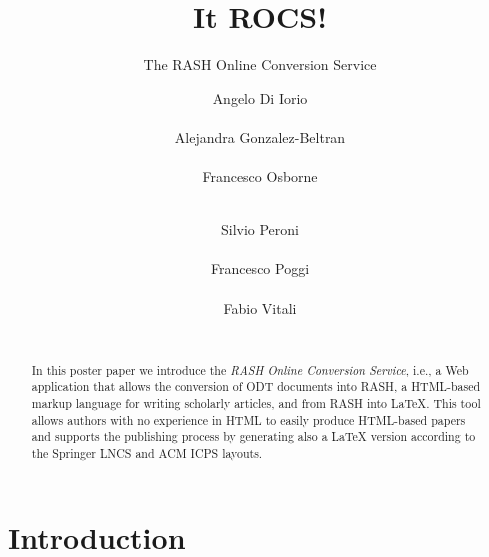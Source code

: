\documentclass{sig-alternate}
\begin{document}
\title{It ROCS!}
\subtitle{The RASH Online Conversion Service}

\author{
\alignauthor
Angelo Di Iorio\\
\\
\alignauthor
Alejandra Gonzalez-Beltran\\
\\
\alignauthor
Francesco Osborne\\
\\
\and
\alignauthor
Silvio Peroni\\
\\
\alignauthor
Francesco Poggi\\
\\
\alignauthor
Fabio Vitali\\
\\
}
\maketitle

\begin{abstract}
In this poster paper we introduce the {\em RASH Online Conversion Service}, i.e., a Web application that allows the conversion of ODT documents into RASH, a HTML-based markup language for writing scholarly articles, and from RASH into LaTeX. This tool allows authors with no experience in HTML to easily produce HTML-based papers and supports the publishing process by generating also a LaTeX version according to the Springer LNCS and ACM ICPS layouts.
\end{abstract}



\section{Introduction}
\end{document}
